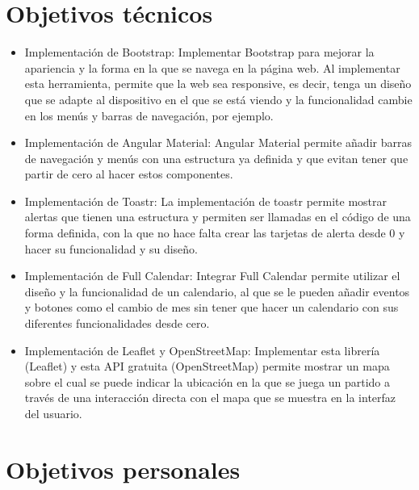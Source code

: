 \section{Objetivos técnicos}\label{objetivos-tecnicos}

\begin{itemize}
\tightlist
\item
Implementación de Bootstrap: Implementar Bootstrap para mejorar la apariencia y la forma en la que se navega en la página web. Al implementar esta herramienta, permite que la web sea responsive, es decir, tenga un diseño que se adapte al dispositivo en el que se está viendo y la funcionalidad cambie en los menús y barras de navegación, por ejemplo.

\item
Implementación de Angular Material: Angular Material permite añadir barras de navegación y menús con una estructura ya definida y que evitan tener que partir de cero al hacer estos componentes.

\item
Implementación de Toastr: La implementación de toastr permite mostrar alertas que tienen una estructura y permiten ser llamadas en el código de una forma definida, con la que no hace falta crear las tarjetas de alerta desde 0 y hacer su funcionalidad y su diseño.

\item
Implementación de Full Calendar: Integrar Full Calendar permite utilizar el diseño y la funcionalidad de un calendario, al que se le pueden añadir eventos y botones como el cambio de mes sin tener que hacer un calendario con sus diferentes funcionalidades desde cero.

\item
Implementación de Leaflet y OpenStreetMap: Implementar esta librería (Leaflet) y esta API gratuita (OpenStreetMap) permite mostrar un mapa sobre el cual se puede indicar la ubicación en la que se juega un partido a través de una interacción directa con el mapa que se muestra en la interfaz del usuario.
\end{itemize}


\section{Objetivos personales}\label{objetivos-personales}

